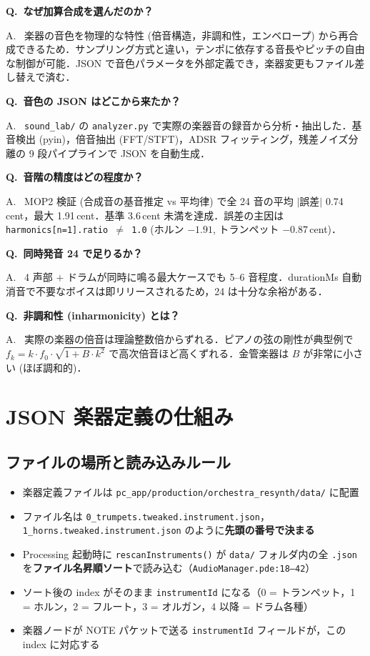 \documentclass[uplatex,dvipdfmx,a4paper,10pt]{jsarticle}
\newcommand{\QA}[2]{%
  \par\noindent\textbf{\textcolor{qcolor}{Q.~#1}}%
  \par\noindent\textcolor{acolor}{A.~#2}\medskip%
}
\begin{document}
\QA{なぜ加算合成を選んだのか？}{
楽器の音色を物理的な特性 (倍音構造，非調和性，エンベロープ) から再合成できるため．サンプリング方式と違い，テンポに依存する音長やピッチの自由な制御が可能．JSON で音色パラメータを外部定義でき，楽器変更もファイル差し替えで済む．}

\QA{音色の JSON はどこから来たか？}{
\texttt{sound\_lab/} の \texttt{analyzer.py} で実際の楽器音の録音から分析・抽出した．基音検出 (pyin)，倍音抽出 (FFT/STFT)，ADSR フィッティング，残差ノイズ分離の 9 段パイプラインで JSON を自動生成．}

\QA{音階の精度はどの程度か？}{
MOP2 検証 (合成音の基音推定 vs 平均律) で全 24 音の平均 $|$誤差$|$ 0.74\,cent，最大 1.91\,cent．基準 3.6\,cent 未満を達成．誤差の主因は \texttt{harmonics[n=1].ratio $\ne$ 1.0} (ホルン $-1.91$, トランペット $-0.87$\,cent)．}

\QA{同時発音 24 で足りるか？}{
4 声部 $+$ ドラムが同時に鳴る最大ケースでも 5--6 音程度．durationMs 自動消音で不要なボイスは即リリースされるため，24 は十分な余裕がある．}

\QA{非調和性 (inharmonicity) とは？}{
実際の楽器の倍音は理論整数倍からずれる．ピアノの弦の剛性が典型例で $f_k = k \cdot f_0 \cdot \sqrt{1 + B \cdot k^2}$ で高次倍音ほど高くずれる．金管楽器は $B$ が非常に小さい (ほぼ調和的)．}

\section{JSON 楽器定義の仕組み}

\subsection{ファイルの場所と読み込みルール}

\begin{itemize}
  \item 楽器定義ファイルは \texttt{pc\_app/production/orchestra\_resynth/data/} に配置
  \item ファイル名は \texttt{0\_trumpets.tweaked.instrument.json}，\texttt{1\_horns.tweaked.instrument.json} のように\textbf{先頭の番号で決まる}
  \item Processing 起動時に \texttt{rescanInstruments()} が \texttt{data/} フォルダ内の全 \texttt{.json} を\textbf{ファイル名昇順ソート}で読み込む（\texttt{AudioManager.pde:18--42}）
  \item ソート後の index がそのまま \texttt{instrumentId} になる（0 = トランペット，1 = ホルン，2 = フルート，3 = オルガン，4 以降 = ドラム各種）
  \item 楽器ノードが NOTE パケットで送る \texttt{instrumentId} フィールドが，この index に対応する
\end{itemize}
\end{document}
